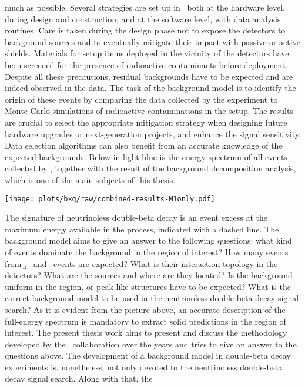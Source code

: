 much as possible. Several strategies are set up in \gerda\ both at the hardware level,
during design and construction, and at the software level, with data analysis routines.
Care is taken during the design phase not to expose the detectors to background sources
and to eventually mitigate their impact with passive or active shields. Materials for
setup items deployed in the vicinity of the detectors have been screened for the presence
of radioactive contaminants before deployment. Despite all these precautions, residual
backgrounds have to be expected and are indeed observed in the data. The task of the
background model is to identify the origin of these events by comparing the data collected
by the experiment to Monte Carlo simulations of radioactive contaminations in the setup.
The results are crucial to select the appropriate mitigation strategy when designing
future hardware upgrades or next-generation projects, and enhance the signal
sensitivity. Data selection algorithms can also benefit from an accurate knowledge of the
expected backgrounds.  Below in light blue is the energy spectrum of all events collected
by \gerda, together with the result of the background decomposition analysis, which is one
of the main subjects of this thesis.
\begin{center}
  \vspace{11pt}
  \texttt{[image: plots/bkg/raw/combined-results-M1only.pdf]}
\end{center}
The signature of neutrinoless double-beta decay is an event excess at the maximum energy
available in the process, indicated with a dashed line. The background model aims to give
an answer to the following questions: what kind of events dominate the background in the
region of interest? How many events from \b, \g\ and \a\ events are expected? What is
their interaction topology in the detectors? What are the sources and where are they
located?  Is the background uniform in the region, or peak-like structures have to be
expected?  What is the correct background model to be used in the neutrinoless double-beta
decay signal search? As it is evident from the picture above, an accurate description of
the full-energy spectrum is mandatory to extract solid predictions in the region of
interest.  The present thesis work aims to present and discuss the methodology developed
by the \gerda\ collaboration over the years and tries to give an answer to the questions
above.
\newpar
The development of a background model in double-beta decay experiments is, nonetheless,
not only devoted to the neutrinoless double-beta decay signal search. Along with that, the
